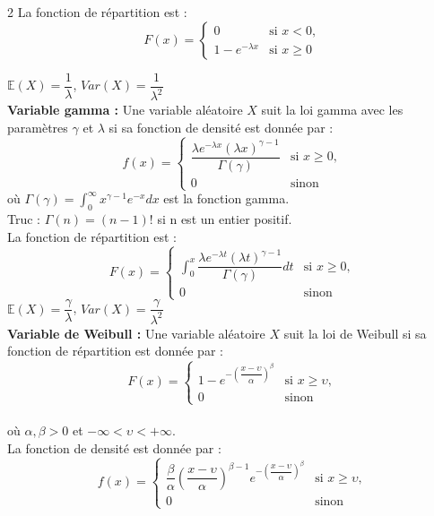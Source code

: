 \documentclass[11pt]{article}
\begin{document}
\begin{multicols}{2}
  La fonction de répartition est : \\
  \[
  F(x) =
  \begin{cases}
    0 & \text{si } x < 0, \\
    1 - e^{-\lambda x} & \text{si } x \geq 0
  \end{cases}
  \] 

  $\mathbb{E}(X) = \dfrac{1}{\lambda}$,
  $Var(X) = \dfrac{1}{\lambda^2}$\\

  
  \textbf{Variable gamma :} Une variable aléatoire $X$ suit la loi gamma avec les paramètres $\gamma$ et $\lambda$ si sa fonction de densité est donnée par : \\
  \[
  f(x) =
  \begin{cases}
    \dfrac{{\lambda e^{-\lambda x}(\lambda x)^{\gamma - 1}}} {\Gamma(\gamma)} & \text{si } x \geq 0, \\
    0 & \text{sinon}
  \end{cases}
  \]
  où $\Gamma(\gamma) = \int_{0}^{\infty} x^{\gamma - 1} e^{-x} dx$ est la fonction gamma. \\
  Truc : $\Gamma(n) = (n-1)!$ si n est un entier positif. \\
  La fonction de répartition est : \\
  \[
  F(x) =
  \begin{cases}
    \int_{0}^{x} \dfrac{\lambda e^{-\lambda t}(\lambda t)^{\gamma - 1}}{\Gamma(\gamma)} dt & \text{si } x \geq 0, \\
    0 & \text{sinon}
  \end{cases}
  \] 
  $\mathbb{E}(X) = \dfrac{\gamma}{\lambda}$, 
  $Var(X) = \dfrac{\gamma}{\lambda^2}$ \\

  \textbf{Variable de Weibull :} Une variable aléatoire $X$ suit la loi de Weibull si sa fonction de répartition est donnée par : \\
  \[
  F(x) = 
  \begin{cases}
    1 - e^{-(\dfrac{x-\upsilon}{\alpha})^\beta} & \text{si } x \geq \upsilon, \\
    0 & \text{sinon}
  \end{cases}
  \] \\
  où $\alpha, \beta > 0$ et $-\infty < \upsilon < +\infty$. \\ 

  La fonction de densité est donnée par : \\
  \[
  f(x) =
  \begin{cases}
    \dfrac{\beta}{\alpha} \left( \dfrac{x-\upsilon}{\alpha} \right)^{\beta-1} e^{-(\dfrac{x-\upsilon}{\alpha})^\beta} & \text{si } x \geq \upsilon, \\
    0 & \text{sinon}
  \end{cases}
  \]


\end{multicols}
\end{document}

